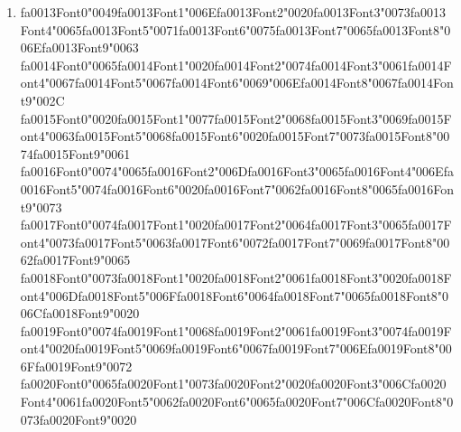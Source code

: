 \documentclass[12pt]{article}
\begin{document}
\begin{enumerate}[label=Q\arabic*.]
\item {\csname fa0013Font0\endcsname\char"0049}{\csname fa0013Font1\endcsname\char"006E}{\csname fa0013Font2\endcsname\char"0020}{\csname fa0013Font3\endcsname\char"0073}{\csname fa0013Font4\endcsname\char"0065}{\csname fa0013Font5\endcsname\char"0071}{\csname fa0013Font6\endcsname\char"0075}{\csname fa0013Font7\endcsname\char"0065}{\csname fa0013Font8\endcsname\char"006E}{\csname fa0013Font9\endcsname\char"0063} {\csname fa0014Font0\endcsname\char"0065}{\csname fa0014Font1\endcsname\char"0020}{\csname fa0014Font2\endcsname\char"0074}{\csname fa0014Font3\endcsname\char"0061}{\csname fa0014Font4\endcsname\char"0067}{\csname fa0014Font5\endcsname\char"0067}{\csname fa0014Font6\endcsname\char"0069}{\char"006E}{\csname fa0014Font8\endcsname\char"0067}{\csname fa0014Font9\endcsname\char"002C} {\csname fa0015Font0\endcsname\char"0020}{\csname fa0015Font1\endcsname\char"0077}{\csname fa0015Font2\endcsname\char"0068}{\csname fa0015Font3\endcsname\char"0069}{\csname fa0015Font4\endcsname\char"0063}{\csname fa0015Font5\endcsname\char"0068}{\csname fa0015Font6\endcsname\char"0020}{\csname fa0015Font7\endcsname\char"0073}{\csname fa0015Font8\endcsname\char"0074}{\csname fa0015Font9\endcsname\char"0061} {\csname fa0016Font0\endcsname\char"0074}{\char"0065}{\csname fa0016Font2\endcsname\char"006D}{\csname fa0016Font3\endcsname\char"0065}{\csname fa0016Font4\endcsname\char"006E}{\csname fa0016Font5\endcsname\char"0074}{\csname fa0016Font6\endcsname\char"0020}{\csname fa0016Font7\endcsname\char"0062}{\csname fa0016Font8\endcsname\char"0065}{\csname fa0016Font9\endcsname\char"0073} {\csname fa0017Font0\endcsname\char"0074}{\csname fa0017Font1\endcsname\char"0020}{\csname fa0017Font2\endcsname\char"0064}{\csname fa0017Font3\endcsname\char"0065}{\csname fa0017Font4\endcsname\char"0073}{\csname fa0017Font5\endcsname\char"0063}{\csname fa0017Font6\endcsname\char"0072}{\csname fa0017Font7\endcsname\char"0069}{\csname fa0017Font8\endcsname\char"0062}{\csname fa0017Font9\endcsname\char"0065} {\csname fa0018Font0\endcsname\char"0073}{\csname fa0018Font1\endcsname\char"0020}{\csname fa0018Font2\endcsname\char"0061}{\csname fa0018Font3\endcsname\char"0020}{\csname fa0018Font4\endcsname\char"006D}{\csname fa0018Font5\endcsname\char"006F}{\csname fa0018Font6\endcsname\char"0064}{\csname fa0018Font7\endcsname\char"0065}{\csname fa0018Font8\endcsname\char"006C}{\csname fa0018Font9\endcsname\char"0020} {\csname fa0019Font0\endcsname\char"0074}{\csname fa0019Font1\endcsname\char"0068}{\csname fa0019Font2\endcsname\char"0061}{\csname fa0019Font3\endcsname\char"0074}{\csname fa0019Font4\endcsname\char"0020}{\csname fa0019Font5\endcsname\char"0069}{\csname fa0019Font6\endcsname\char"0067}{\csname fa0019Font7\endcsname\char"006E}{\csname fa0019Font8\endcsname\char"006F}{\csname fa0019Font9\endcsname\char"0072} {\csname fa0020Font0\endcsname\char"0065}{\csname fa0020Font1\endcsname\char"0073}{\csname fa0020Font2\endcsname\char"0020}{\csname fa0020Font3\endcsname\char"006C}{\csname fa0020Font4\endcsname\char"0061}{\csname fa0020Font5\endcsname\char"0062}{\csname fa0020Font6\endcsname\char"0065}{\csname fa0020Font7\endcsname\char"006C}{\csname fa0020Font8\endcsname\char"0073}{\csname fa0020Font9\endcsname\char"0020} 
\end{enumerate}
\end{document}
